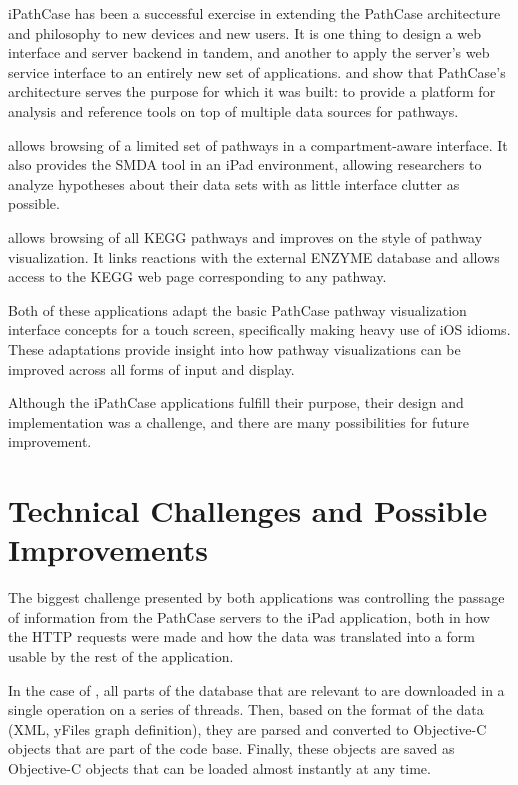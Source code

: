 iPathCase has been a successful exercise in extending the PathCase architecture
and philosophy to new devices and new users. It is one thing to design a web
interface and server backend in tandem, and another to apply the server's web
service interface to an entirely new set of applications. \mawapp and \keggapp
show that PathCase's architecture serves the purpose for which it was built: to
provide a platform for analysis and reference tools on top of multiple data
sources for pathways.

\mawapp allows browsing of a limited set of pathways in a compartment-aware
interface. It also provides the SMDA tool in an iPad environment, allowing
researchers to analyze hypotheses about their data sets with as little interface
clutter as possible.

\keggapp allows browsing of all KEGG pathways and improves on the \mawapp style
of pathway visualization. It links reactions with the external ENZYME database
and allows access to the KEGG web page corresponding to any pathway.

Both of these applications adapt the basic PathCase pathway visualization
interface concepts for a touch screen, specifically making heavy use of iOS
idioms. These adaptations provide insight into how pathway visualizations can be
improved across all forms of input and display.

Although the iPathCase applications fulfill their purpose, their design and
implementation was a challenge, and there are many possibilities for future
improvement.

\section{Technical Challenges and Possible Improvements}

The biggest challenge presented by both applications was controlling the passage
of information from the PathCase servers to the iPad application, both in how
the HTTP requests were made and how the data was translated into a form usable
by the rest of the application.

In the case of \mawapp, all parts of the \pathcasemaw database that are relevant
to \mawapp are downloaded in a single operation on a series of threads. Then,
based on the format of the data (XML, yFiles graph definition), they are parsed
and converted to Objective-C objects that are part of the \mawapp code base.
Finally, these objects are saved as Objective-C objects that can be loaded
almost instantly at any time.

